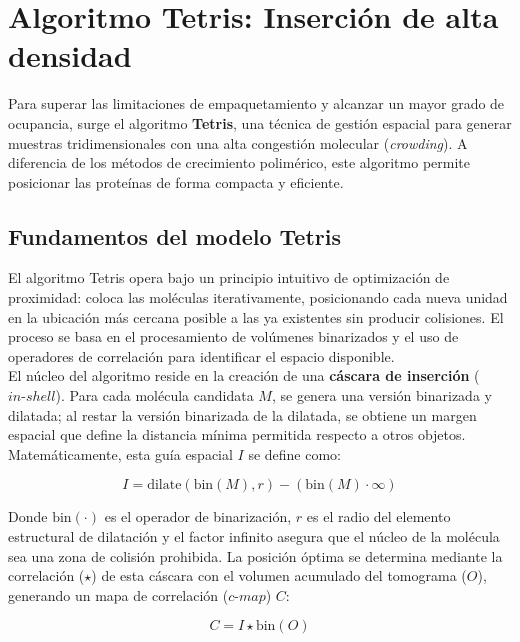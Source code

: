\section{Algoritmo Tetris: Inserción de alta densidad}

Para superar las limitaciones de empaquetamiento y alcanzar un mayor grado de ocupancia, surge el algoritmo \textbf{Tetris}, una técnica de gestión espacial para generar muestras tridimensionales con una alta congestión molecular (\textit{crowding}). A diferencia de los métodos de crecimiento polimérico, este algoritmo permite posicionar las proteínas de forma compacta y eficiente.

\subsection{Fundamentos del modelo Tetris}

El algoritmo Tetris opera bajo un principio intuitivo de optimización de proximidad: coloca las moléculas iterativamente, posicionando cada nueva unidad en la ubicación más cercana posible a las ya existentes sin producir colisiones. El proceso se basa en el procesamiento de volúmenes binarizados y el uso de operadores de correlación para identificar el espacio disponible.\\

El núcleo del algoritmo reside en la creación de una \textbf{cáscara de inserción} ($in\text{-}shell$). Para cada molécula candidata $M$, se genera una versión binarizada y dilatada; al restar la versión binarizada de la dilatada, se obtiene un margen espacial que define la distancia mínima permitida respecto a otros objetos. Matemáticamente, esta guía espacial $I$ se define como:

\begin{equation}
I = \text{dilate}(\text{bin}(M), r) - (\text{bin}(M) \cdot \infty)
\end{equation}

Donde $\text{bin}(\cdot)$ es el operador de binarización, $r$ es el radio del elemento estructural de dilatación y el factor infinito asegura que el núcleo de la molécula sea una zona de colisión prohibida. La posición óptima se determina mediante la correlación ($\star$) de esta cáscara con el volumen acumulado del tomograma ($O$), generando un mapa de correlación ($c\text{-}map$) $C$:

\begin{equation}
C = I \star \text{bin}(O)
\end{equation}

